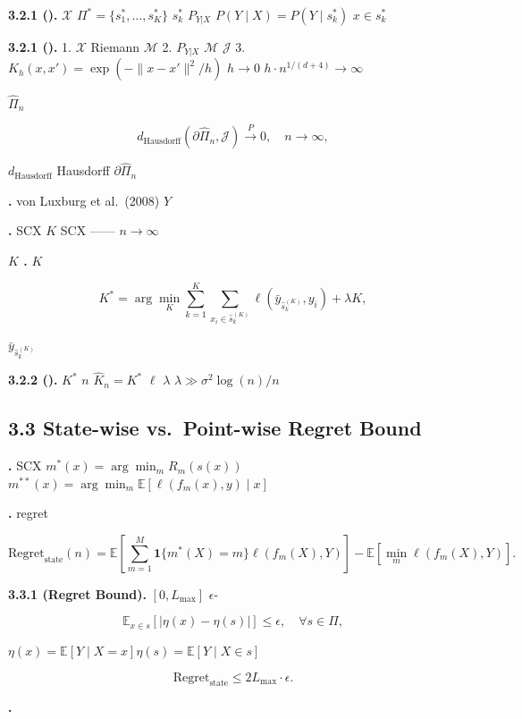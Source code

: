 \documentclass[
  12pt,
]{article}
\begin{document}
\textbf{ 3.2.1 ().}  \(\mathcal{X}\)
 \(\Pi^* = \{s_1^*, \dots, s_K^*\}\) \(s_k^*\)
 \(P_{Y|X}\)
\textbf{}\(P(Y \mid X) = P(Y \mid s_k^*)\) 
\(x \in s_k^*\) 

\textbf{ 3.2.1 ().}  1. \(\mathcal{X}\)
 Riemann  \(\mathcal{M}\) 2.  \(P_{Y|X}\) 
\(\mathcal{M}\)  \(\mathcal{J}\) 3.
 \(K_h(x, x') = \exp(-\|x - x'\|^2 / h)\)  \(h \to 0\) 
\(h \cdot n^{1/(d+4)} \to \infty\)

 \(\hat{\Pi}_n\) 

\[d_{\text{Hausdorff}}(\partial \hat{\Pi}_n, \mathcal{J}) \xrightarrow{P} 0, \quad n \to \infty,\]

 \(d_{\text{Hausdorff}}\)  Hausdorff
\(\partial \hat{\Pi}_n\) 

\textbf{.}  von Luxburg et al.~(2008)
 \(Y\) 

\textbf{.}  SCX  \(K\)
 SCX
------ \(n \to \infty\)

\textbf{\(K\) .}  \(K\)

\[K^* = \arg\min_K \sum_{k=1}^K \sum_{x_i \in \hat{s}_k^{(K)}} \ell(\bar{y}_{\hat{s}_k^{(K)}}, y_i) + \lambda K,\]

 \(\bar{y}_{\hat{s}_k^{(K)}}\)


\textbf{ 3.2.2 ().}  \(K^*\)
 \(n\) \(\hat{K}_n = K^*\)
\(\ell\)  \(\lambda\) 
\(\lambda \gg \sigma^2 \log(n)/n\)

\subsection{3.3 State-wise vs.~Point-wise Regret
Bound}\label{state-wise-vs.-point-wise-regret-bound}

\textbf{.} SCX  \(m^*(x) = \arg\min_m R_m(s(x))\)
 \(m^{**}(x) = \arg\min_m \mathbb{E}[\ell(f_m(x), y) \mid x]\)


\textbf{.}  regret 

\[\text{Regret}_{\text{state}}(n) = \mathbb{E}\left[\sum_{m=1}^M \mathbf{1}\{m^*(X) = m\} \ell(f_m(X), Y)\right] - \mathbb{E}\left[\min_m \ell(f_m(X), Y)\right].\]

\textbf{ 3.3.1 (Regret Bound).} 
\([0, L_{\max}]\) \(\epsilon\)-

\[\mathbb{E}_{x \in s}[|\eta(x) - \eta(s)|] \leq \epsilon, \quad \forall s \in \Pi,\]


\(\eta(x) = \mathbb{E}[Y \mid X = x]\)\(\eta(s) = \mathbb{E}[Y \mid X \in s]\)

\[\text{Regret}_{\text{state}} \leq 2L_{\max} \cdot \epsilon.\]

\textbf{.}
\end{document}

